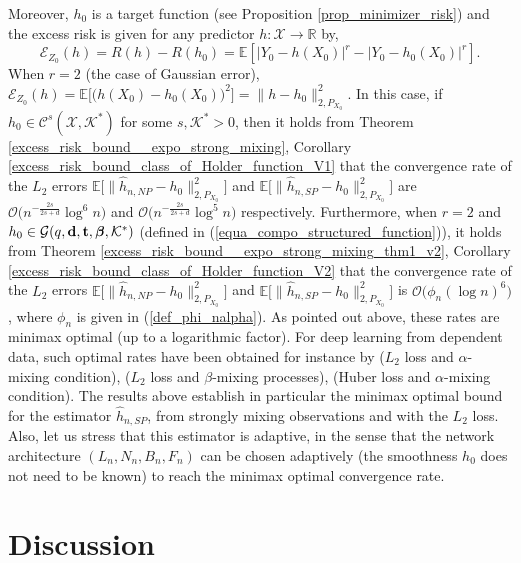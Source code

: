 \documentclass[10pt,twoside]{article}
\numberwithin{equation}{section}
\newcommand{\E}{\ensuremath{\mathbb{E}}}
\newcommand{\R}{\ensuremath{\mathbb{R}}}
\newcommand{\mk}{ { \mathcal{K}} }
\newcommand{\mx}{ { \mathcal{X}} }
\begin{document}
\medskip
\noindent
Moreover, $h_0$ is a target function (see Proposition \ref{prop_minimizer_risk}) and the excess risk is given for any predictor $h: \mx \rightarrow \R$ by,
%
\begin{equation}\label{excess_risk_Subbotin}
\mathcal{E}_{Z_0}(h) = R(h) - R(h_0) = \E [ | Y_0 - h(X_0) |^r -| Y_0 - h_0(X_0) |^r ] . 
\end{equation}
%
When $r=2$ (the case of Gaussian error), $\mathcal{E}_{Z_0}(h) = \E\big[ \big( h(X_0) - h_0(X_0) \big)^2 \big] = \| h - h_0\|^2_{2, P_{X_0}} $. 
%
In this case, if $h_0 \in \mathcal{C}^{s}(\mathcal{X}, \mathcal{K}^{*})$ for some $s, \mk^* >0$, then it holds from Theorem \ref{excess_risk_bound__expo_strong_mixing}, Corollary \ref{excess_risk_bound_class_of_Holder_function_V1} that the convergence rate of the $L_2$ errors $\E \big[\|\widehat{h}_{n,NP} - h_0\|^2_{2, P_{X_0}} \big]$ and $\E \big[\|\widehat{h}_{n,SP} - h_0\|^2_{2, P_{X_0}} \big]$ are $\mathcal{O}\big( n^{-\frac{2 s}{2 s + d} }  \log^6 n\big)$ and $\mathcal{O}\big( n^{-\frac{2 s}{2 s + d} }  \log^5 n\big)$ respectively.  
%
Furthermore, when $r=2$ and $h_0 \in \mathcal{G}(q, \bold{d}, \bold{t}, \boldsymbol{\beta}, \mk^{*})$ (defined in (\ref{equa_compo_structured_function})), it holds from Theorem \ref{excess_risk_bound__expo_strong_mixing_thm1_v2}, Corollary \ref{excess_risk_bound_class_of_Holder_function_V2} that the convergence rate of the $L_2$ errors $\E \big[\|\widehat{h}_{n,NP} - h_0\|^2_{2, P_{X_0}} \big]$ and $\E \big[\|\widehat{h}_{n,SP} - h_0\|^2_{2, P_{X_0}} \big]$ is $\mathcal{O}\big( \phi_n (\log n)^{6} \big)$, where $\phi_n$ is given in (\ref{def_phi_nalpha}).
%
As pointed out above, these rates are minimax optimal (up to a logarithmic factor).
%
For deep learning from dependent data, such optimal rates have been obtained for instance by \cite{ma2022theoretical} ($L_2$ loss and $\alpha$-mixing condition), \cite{kurisu2025adaptive} ($L_2$ loss and $\beta$-mixing processes), \cite{kengne2025deep} (Huber loss and $\alpha$-mixing condition).
%
The results above establish in particular the minimax optimal bound for the estimator $\widehat{h}_{n,SP}$, from strongly mixing observations and with the $L_2$ loss.
Also, let us stress that this estimator is adaptive, in the sense that the network architecture $(L_n, N_n, B_n, F_n)$ can be chosen adaptively (the smoothness $h_0$ does not need to be known) to reach the minimax optimal convergence rate.
 

 

\section{Discussion}\label{discussion}
\end{document}
